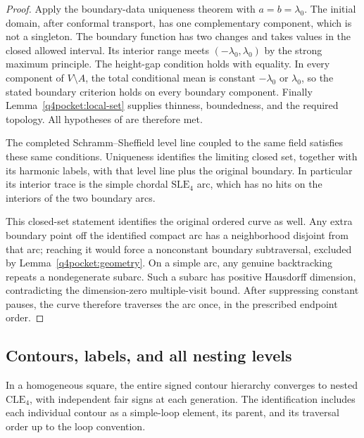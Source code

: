 \begin{proof}
Apply the boundary-data uniqueness theorem with
$a=b=\lambda_0$.  The initial domain, after conformal transport,
has one complementary component, which is not a singleton.
The boundary function has two changes and takes values in the
closed allowed interval.  Its interior range meets
$(-\lambda_0,\lambda_0)$ by the strong maximum principle.
The height-gap condition holds with equality.  In every
component of $V\setminus A$, the total conditional mean is
constant $-\lambda_0$ or $\lambda_0$, so the stated boundary
criterion holds on every boundary component.  Finally
Lemma~\ref{q4pocket:local-set} supplies thinness, boundedness,
and the required topology.  All hypotheses of
\citet[Theorem~3.21]{AruLupuSepulveda2020} are therefore met.

The completed Schramm--Sheffield level line coupled to the
same field satisfies these same conditions.  Uniqueness
identifies the limiting closed set, together with its harmonic
labels, with that level line plus the original boundary.
In particular its interior trace is the simple chordal
$\mathrm{SLE}_4$ arc, which has no hits on the interiors of
the two boundary arcs.

This closed-set statement identifies the original ordered
curve as well.  Any extra boundary point off the identified
compact arc has a neighborhood disjoint from that arc; reaching
it would force a nonconstant boundary subtraversal, excluded
by Lemma~\ref{q4pocket:geometry}.  On a simple arc, any
genuine backtracking repeats a nondegenerate subarc.  Such a
subarc has positive Hausdorff dimension, contradicting the
dimension-zero multiple-visit bound.  After suppressing constant
pauses, the curve therefore traverses the arc once, in the
prescribed endpoint order.
\end{proof}

\subsection{Contours, labels, and all nesting levels}

\begin{proposition}
\label{q4pocket:square-cle}
In a homogeneous square, the entire signed contour hierarchy
converges to nested $\mathrm{CLE}_4$, with independent fair
signs at each generation.  The identification includes each
individual contour as a simple-loop element, its parent, and
its traversal order up to the loop convention.
\end{proposition}

